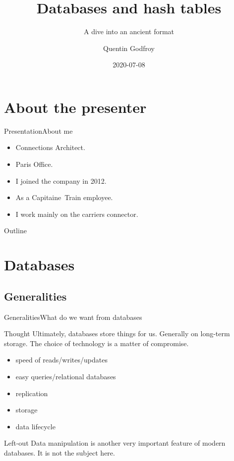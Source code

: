\documentclass{beamer}
\title{Databases and hash tables}
\subtitle{A dive into an ancient format}
\author{Quentin Godfroy}
\institute{Trainline}
\date{2020-07-08}
\begin{document}
\begin{frame}
  \titlepage
\end{frame}

\section*{About the presenter}

\begin{frame}{Presentation}{About me}

  \begin{itemize}
  \item
    Connections Architect.
  \item
    Paris Office.
  \item
    I joined the company in 2012.
  \item
    As a Capitaine~Train employee.
  \item
    I work mainly on the carriers connector.
  \end{itemize}

\end{frame}

\begin{frame}{Outline}
  \tableofcontents
\end{frame}

\section{Databases}
\subsection{Generalities}

\begin{frame}{Generalities}{What do we want from databases}
\begin{block}{Thought}
Ultimately, databases store things for us. Generally on long-term storage. The choice of technology is a matter of compromise.
\end{block}

\begin{itemize}
\item speed of reads/writes/updates
\item easy queries/relational databases
\item replication
\item storage
\item data lifecycle
\end{itemize}

\begin{block}{Left-out}
Data manipulation is another very important feature of modern databases. It
is not the subject here.
\end{block}

\end{frame}
\end{document}
